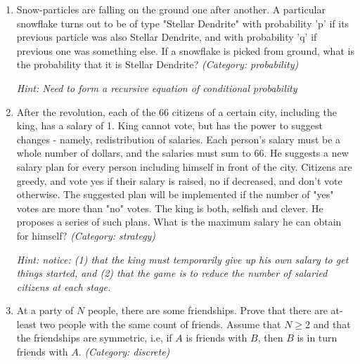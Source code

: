 \begin{enumerate}

\item Snow-particles are falling on the ground one after another. A particular snowflake turns out to be of type "Stellar Dendrite" with probability 'p' if its previous particle was also Stellar Dendrite, and with probability 'q' if previous one was something else. If a snowflake is picked from ground, what is the probability that it is Stellar Dendrite?
\small\emph{(Category: probability)}

\small\emph{Hint: Need to form a recursive equation of conditional probability}





\item After the revolution, each of the 66 citizens of a certain city, including the king, has a salary of 1. King cannot vote, but has the power to suggest changes - namely, redistribution of salaries. Each person's salary must be a whole number of dollars, and the salaries must sum to 66. He suggests a new salary plan for every person including himself in front of the city. Citizens are greedy, and vote yes if their salary is raised, no if decreased, and don't vote otherwise.  The suggested plan will be implemented if the number of "yes" votes are more than "no" votes. The king is both, selfish and clever. He proposes a series of such plans. What is the maximum salary he can obtain for himself?
\small\emph{(Category: strategy)}

\small\emph{Hint: notice:  (1) that the king must temporarily give up his own salary to get things started, and (2) that the game is to reduce the number of salaried citizens at each stage.}





\item At a party of $N$ people, there are some friendships. Prove that there are at-least two people with the same count of friends.
Assume that $N \ge 2$ and that the friendships are symmetric, i.e, if $A$ is friends with $B$, then $B$ is in turn friends with $A$.
\small\emph{(Category: discrete)}


\end{enumerate}

